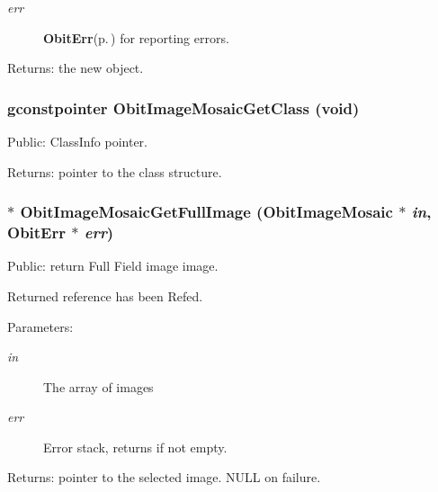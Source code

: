 \begin{Desc}
\begin{description}
\begin{itemize}
\end{itemize}
\item[{\em err}]{\bf Obit\-Err}{\rm (p.\,\pageref{structObitErr})} for reporting errors. \end{description}
\end{Desc}
\begin{Desc}
\item[Returns:]the new object. \end{Desc}
\subsubsection{\setlength{\rightskip}{0pt plus 5cm}gconstpointer Obit\-Image\-Mosaic\-Get\-Class (void)}\label{ObitImageMosaic_8h_a8}


Public: Class\-Info pointer. 

\begin{Desc}
\item[Returns:]pointer to the class structure. \end{Desc}
\subsubsection{$\ast$ Obit\-Image\-Mosaic\-Get\-Full\-Image ({\bf Obit\-Image\-Mosaic} $\ast$ {\em in}, {\bf Obit\-Err} $\ast$ {\em err})}\label{ObitImageMosaic_8h_a14}


Public: return Full Field image image. 

Returned reference has been Refed. \begin{Desc}
\item[Parameters:]
\begin{description}
\item[{\em in}]The array of images \item[{\em err}]Error stack, returns if not empty. \end{description}
\end{Desc}
\begin{Desc}
\item[Returns:]pointer to the selected image. NULL on failure. \end{Desc}
